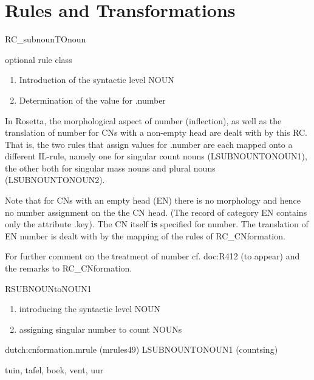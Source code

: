 \section{Rules and Transformations}
\begin{mruleclass}{RC\_subnounTOnoun}
\begin{classdescr}
\kind optional rule class
\classtask
\begin{enumerate}
  \item 
Introduction of the syntactic level NOUN
  \item
Determination of the value for .number
\end{enumerate}
\classremarks
In Rosetta, the morphological aspect of number (inflection),
as well as the translation
of number for CNs with a non-empty head
are dealt with by this RC.
That is, the two rules that assign values for .number 
are each mapped onto  a different IL-rule, 
namely one 
for singular count nouns (LSUBNOUNTONOUN1), the other both for singular
mass nouns and plural nouns  (LSUBNOUNTONOUN2).

Note that for CNs with an empty head (EN)
there is no morphology and hence no number assignment 
on the the CN head. (The record of category EN contains only the attribute 
.key). The CN itself {\bf is} 
specified for number. The translation
of EN number is dealt with by the mapping of the rules of RC\_CNformation. 

For further comment on the treatment of number cf. doc:R412 (to appear)
and the remarks to RC\_CNformation.
\nofilters
\nospeedrules

\noplannedrules

\norulesnotince


\end{classdescr}

\begin{members}
\begin{member}
 RSUBNOUNtoNOUN1
 \begin{enumerate}
  \item 
introducing the syntactic level NOUN
  \item
assigning singular number to 
count NOUNs
\end{enumerate}
\file dutch:cnformation.mrule (mrules49)
\semantics LSUBNOUNTONOUN1 (countsing)

\example tuin, tafel, boek, vent, uur
\remarks\mbox{}


\end{member}
\end{members}
\end{mruleclass}
